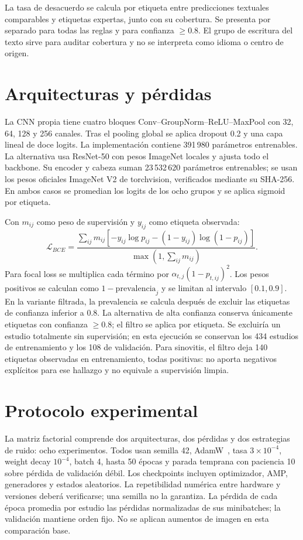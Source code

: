 La tasa de desacuerdo se calcula por etiqueta entre predicciones textuales comparables y etiquetas expertas,
junto con su cobertura. Se presenta por separado para todas las reglas y para confianza $\geq0.8$.
El grupo de escritura del texto sirve para auditar cobertura y no se interpreta como idioma o centro de origen.

\section{Arquitecturas y pérdidas}
La CNN propia tiene cuatro bloques Conv--GroupNorm--ReLU--MaxPool con 32, 64, 128 y 256 canales.
Tras el pooling global se aplica dropout 0.2 y una capa lineal de doce logits.
La implementación contiene 391\,980 parámetros entrenables.
La alternativa usa ResNet-50 con pesos ImageNet locales y ajusta todo el backbone.
Su encoder y cabeza suman 23\,532\,620 parámetros entrenables; se usan los pesos oficiales
ImageNet V2 de torchvision, verificados mediante su SHA-256.
En ambos casos se promedian los logits de los ocho grupos y se aplica sigmoid por etiqueta.

Con $m_{ij}$ como peso de supervisión y $y_{ij}$ como etiqueta observada:
\begin{equation}
\mathcal{L}_{BCE}=
\frac{\sum_{ij}m_{ij}[-y_{ij}\log p_{ij}-(1-y_{ij})\log(1-p_{ij})]}
{\max(1,\sum_{ij}m_{ij})}.
\end{equation}
Para focal loss se multiplica cada término por $\alpha_{t,j}(1-p_{t,ij})^2$.
Los pesos positivos se calculan como $1-\mathrm{prevalencia}_j$ y se limitan al intervalo $[0.1,0.9]$.
En la variante filtrada, la prevalencia se calcula después de excluir las etiquetas de confianza inferior a 0.8.
La alternativa de alta confianza conserva únicamente etiquetas con confianza $\geq0.8$;
el filtro se aplica por etiqueta. Se excluiría un estudio totalmente sin supervisión;
en esta ejecución se conservan los 434 estudios de entrenamiento y los 108 de validación.
Para sinovitis, el filtro deja 140 etiquetas observadas en entrenamiento, todas positivas:
no aporta negativos explícitos para ese hallazgo y no equivale a supervisión limpia.

\section{Protocolo experimental}
La matriz factorial comprende dos arquitecturas, dos pérdidas y dos estrategias de ruido: ocho experimentos.
Todos usan semilla 42, AdamW~\cite{adamw}, tasa $3\times10^{-4}$, weight decay $10^{-4}$,
batch 4, hasta 50 épocas y parada temprana con paciencia 10 sobre pérdida de validación débil.
Los checkpoints incluyen optimizador, AMP, generadores y estados aleatorios.
La repetibilidad numérica entre hardware y versiones deberá verificarse; una semilla no la garantiza.
La pérdida de cada época promedia por estudio las pérdidas normalizadas de sus minibatches;
la validación mantiene orden fijo. No se aplican aumentos de imagen en esta comparación base.

